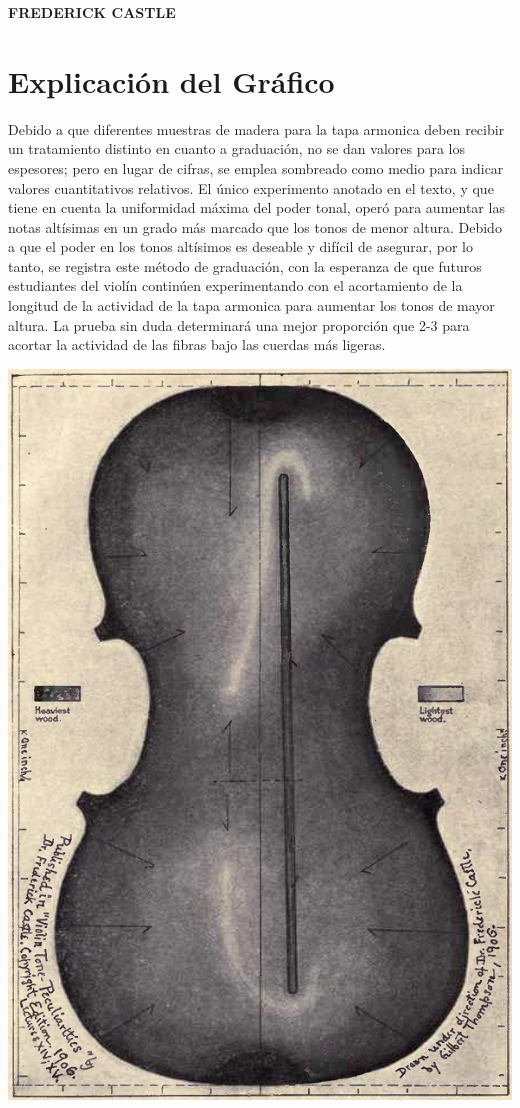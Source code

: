 \documentclass[12pt]{book}
\begin{document}
\begin{flushright}
\textbf{FREDERICK CASTLE}
\end{flushright}

\chapter*{Explicación del Gráfico}

Debido a que diferentes muestras de madera para la tapa armonica deben recibir un tratamiento distinto en cuanto a graduación, no se dan valores para los espesores; pero en lugar de cifras, se emplea sombreado como medio para indicar valores cuantitativos relativos. El único experimento anotado en el texto, y que tiene en cuenta la uniformidad máxima del poder tonal, operó para aumentar las notas altísimas en un grado más marcado que los tonos de menor altura. Debido a que el poder en los tonos altísimos es deseable y difícil de asegurar, por lo tanto, se registra este método de graduación, con la esperanza de que futuros estudiantes del violín continúen experimentando con el acortamiento de la longitud de la actividad de la tapa armonica para aumentar los tonos de mayor altura. La prueba sin duda determinará una mejor proporción que 2-3 para acortar la actividad de las fibras bajo las cuerdas más ligeras.

\begin{center}
\includegraphics[width=1\textwidth]{./img/grafico.png} %
\end{center}
\end{document}
